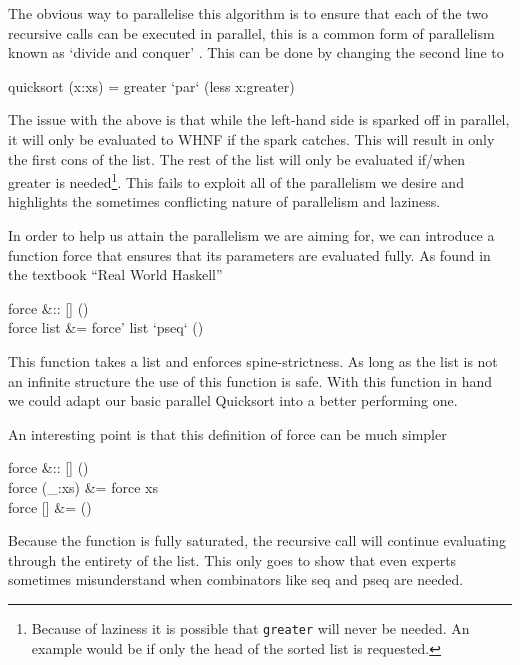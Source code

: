 The obvious way to parallelise this algorithm is to ensure that each of the two
recursive calls can be executed in parallel, this is a common form of
parallelism known as `divide and conquer' \citep{skeletons}.  This can be done
by changing the second line to

\begin{haskell}
quicksort (x:xs) = greater `par` (less \hsapp x:greater)
\end{haskell}

The issue with the above is that while the left-hand side is sparked off in
parallel, it will only be evaluated to WHNF if the spark catches. This will
result in only the first \<cons\> of the list. The rest of the list will
only be evaluated if/when \<greater\> is needed\footnote{Because of
laziness it is possible that \texttt{greater} will never be needed. An
example would be if only the head of the sorted list is requested.}. This
fails to exploit all of the parallelism we desire and highlights the sometimes
conflicting nature of parallelism and laziness.

    In order to help us attain the parallelism we are aiming for, we can
introduce a function \<force\> that ensures that its parameters are evaluated
fully. As found in the textbook ``Real World Haskell'' \citep{realWorld}

\begin{haskell}
force &:: [\hasalpha] \to ()\\
force list &= force' list `pseq` ()
\end{haskell}

This function takes a list and enforces spine-strictness. As long as the list is
not an infinite structure the use of this function is safe. With this function
in hand we could adapt our basic parallel Quicksort into a better performing one.

An interesting point is that this definition of \<force\> can be much simpler

\begin{haskell}
force &:: [\hasalpha] \to () \\
force (\_:xs) &= force xs\\
force []           &= ()
\end{haskell}

Because the function is fully saturated, the recursive call will continue
evaluating through the entirety of the list. This only goes to show that even
experts sometimes misunderstand when combinators like \<seq\> and \<pseq\> are
needed.

